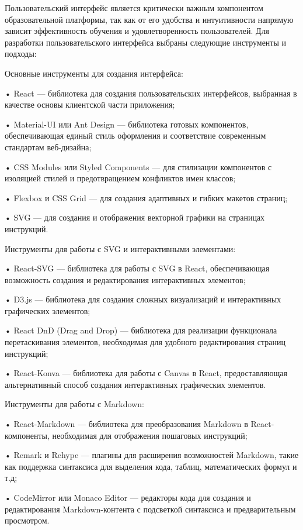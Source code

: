 {\gostFont

  \par \redline Пользовательский интерфейс является критически важным компонентом образовательной платформы, так как от его удобства и интуитивности напрямую зависит эффективность обучения и удовлетворенность пользователей. Для разработки пользовательского интерфейса выбраны следующие инструменты и подходы:

  \par \redline Основные инструменты для создания интерфейса:

  \par \redline • React — библиотека для создания пользовательских интерфейсов, выбранная в качестве основы клиентской части приложения;
  \par \redline • Material-UI или Ant Design — библиотека готовых компонентов, обеспечивающая единый стиль оформления и соответствие современным стандартам веб-дизайна;
  \par \redline • CSS Modules или Styled Components — для стилизации компонентов с изоляцией стилей и предотвращением конфликтов имен классов;
  \par \redline • Flexbox и CSS Grid — для создания адаптивных и гибких макетов страниц;
  \par \redline • SVG — для создания и отображения векторной графики на страницах инструкций.

  \par \redline Инструменты для работы с SVG и интерактивными элементами:

  \par \redline • React-SVG — библиотека для работы с SVG в React, обеспечивающая возможность создания и редактирования интерактивных элементов;
  \par \redline • D3.js — библиотека для создания сложных визуализаций и интерактивных графических элементов;
  \par \redline • React DnD (Drag and Drop) — библиотека для реализации функционала перетаскивания элементов, необходимая для удобного редактирования страниц инструкций;
  \par \redline • React-Konva — библиотека для работы с Canvas в React, предоставляющая альтернативный способ создания интерактивных графических элементов.

  \par \redline Инструменты для работы с Markdown:

  \par \redline • React-Markdown — библиотека для преобразования Markdown в React-компоненты, необходимая для отображения пошаговых инструкций;
  \par \redline • Remark и Rehype — плагины для расширения возможностей Markdown, такие как поддержка синтаксиса для выделения кода, таблиц, математических формул и т.д;
  \par \redline • CodeMirror или Monaco Editor — редакторы кода для создания и редактирования Markdown-контента с подсветкой синтаксиса и предварительным просмотром.

}
